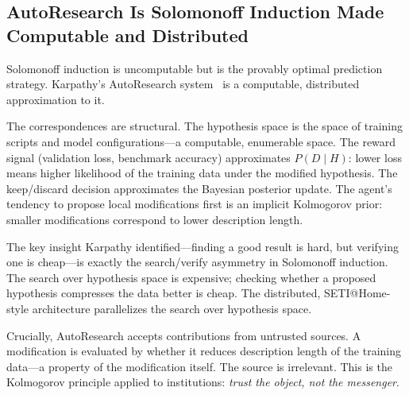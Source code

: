 \subsection{AutoResearch Is Solomonoff Induction Made Computable and Distributed}

Solomonoff induction is uncomputable but is the provably optimal prediction
strategy. Karpathy's AutoResearch system~\cite{karpathy2026} is a computable,
distributed approximation to it.

The correspondences are structural. The hypothesis space is the space of
training scripts and model configurations---a computable, enumerable space.
The reward signal (validation loss, benchmark accuracy) approximates
$P(D \mid H)$: lower loss means higher likelihood of the training data under
the modified hypothesis. The keep/discard decision approximates the Bayesian
posterior update. The agent's tendency to propose local modifications first
is an implicit Kolmogorov prior: smaller modifications correspond to lower
description length.

The key insight Karpathy identified---finding a good result is hard, but
verifying one is cheap---is exactly the search/verify asymmetry in Solomonoff
induction. The search over hypothesis space is expensive; checking whether a
proposed hypothesis compresses the data better is cheap. The distributed,
SETI@Home-style architecture parallelizes the search over hypothesis space.

Crucially, AutoResearch accepts contributions from untrusted sources. A
modification is evaluated by whether it reduces description length of the
training data---a property of the modification itself. The source is
irrelevant. This is the Kolmogorov principle applied to institutions:
\emph{trust the object, not the messenger}.